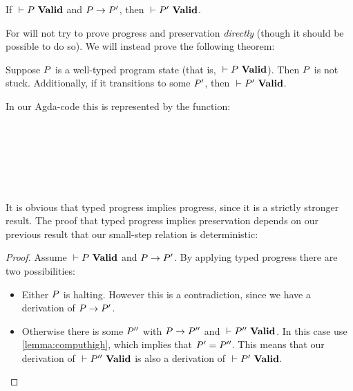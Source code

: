 \begin{theorem}
  \label{lemma:atalpreservation}
  If ${} |- {P}\ \mathbf{Valid}$ and $P -> P'$, then ${} |- {P'}\ \mathbf{Valid}$.
\end{theorem}

For \ATAL will not try to prove progress and preservation \emph{directly}
(though it should be possible to do so). We will instead prove the following
theorem:

\begin{theorem}
  \label{lemma:atalprogress+}
  Suppose $P$ is a well-typed program state (that is,
  ${} |- {P}\ \mathbf{Valid}$). Then $P$ is not stuck. Additionally, if it
  transitions to some $P'$, then ${} |- {P'}\ \mathbf{Valid}$.
\end{theorem}

In our Agda-code this is represented by the function:

\begin{code}
\> \AgdaSymbol{:}  \AgdaSymbol{\{}\AgdaSymbol{\}} \<%
\\
\>[2]\<[19]%
\>[19]   \<%
\\
\>[2]\<[19]%
\>[19]  \<%
\\
\>[2]\<[19]%
\>[19]\AgdaSymbol{(}   \<%
\\
\>[19]\<[21]%
\>[21]   \<%
\\
\>[19]\<[21]%
\>[21]   \AgdaSymbol{)}\<%
\end{code}

It is obvious that typed progress implies progress, since it is a strictly
stronger result. The proof that typed progress implies preservation depends on
our previous result that our small-step relation is deterministic:

\begin{proof}
  Assume ${} |- {P}\ \mathbf{Valid}$ and $P -> P'$. By applying typed
  progress there are two possibilities:

  \begin{itemize}
  \item Either $P$ is halting. However this is a contradiction, since we
    have a derivation of $P -> P'$.

  \item Otherwise there is some $P''$ with $P -> P''$ and
    ${} |- {P''}\ \mathbf{Valid}$. In this case use \cref{lemma:computhigh}, which
    implies that $P' = P''$. This means that our derivation of
    ${} |- {P''}\ \mathbf{Valid}$ is also a derivation of ${} |- {P'}\ \mathbf{Valid}$.
  \end{itemize}
\end{proof}

